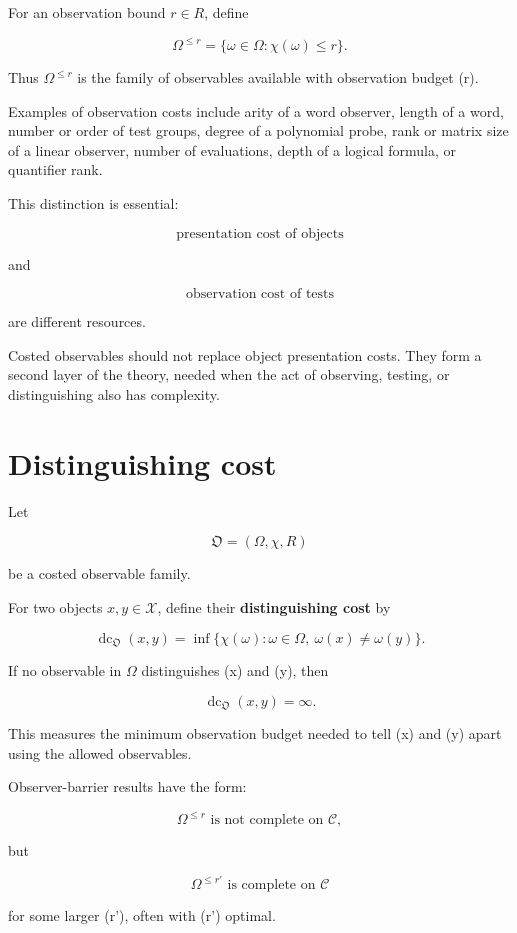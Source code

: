 \documentclass[11pt]{article}
\begin{document}
For an observation bound \(r\in R\), define

\[
\Omega^{\leq r}=\{\omega\in\Omega:\chi(\omega)\leq r\}.
\]

Thus \(\Omega^{\leq r}\) is the family of observables available with observation budget (r).

Examples of observation costs include arity of a word observer, length of a word, number or order of test groups, degree of a polynomial probe, rank or matrix size of a linear observer, number of evaluations, depth of a logical formula, or quantifier rank.

This distinction is essential:

\[
\text{presentation cost of objects}
\]

and

\[
\text{observation cost of tests}
\]

are different resources.

Costed observables should not replace object presentation costs. They form a second layer of the theory, needed when the act of observing, testing, or distinguishing also has complexity.


\section{Distinguishing cost}

Let

\[
\mathfrak O=(\Omega,\chi,R)
\]

be a costed observable family.

For two objects \(x,y\in\mathcal X\), define their \textbf{distinguishing cost} by

\[
\operatorname{dc}_{\mathfrak O}(x,y)=\inf\{\chi(\omega):\omega\in\Omega,\ \omega(x)\neq\omega(y)\}.
\]

If no observable in \(\Omega\) distinguishes (x) and (y), then

\[
\operatorname{dc}_{\mathfrak O}(x,y)=\infty.
\]

This measures the minimum observation budget needed to tell (x) and (y) apart using the allowed observables.

Observer-barrier results have the form:

\[
\Omega^{\leq r}\text{ is not complete on }\mathcal C,
\]

but

\[
\Omega^{\leq r'}\text{ is complete on }\mathcal C
\]

for some larger (r'), often with (r') optimal.
\end{document}
